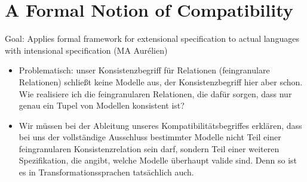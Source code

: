 
\section{A Formal Notion of Compatibility}
Goal: Applies formal framework for extensional specification to actual languages with intensional specification (MA Aurélien)


\begin{itemize}
    \item Problematisch: unser Konsistenzbegriff für Relationen (feingranulare Relationen) schließt keine Modelle aus, der Konsistenzbegriff hier aber schon. Wie realisiere ich die feingranularen Relationen, die dafür sorgen, dass nur genau ein Tupel von Modellen konsistent ist?
    \item Wir müssen bei der Ableitung unseres Kompatibilitätsbegriffes erklären, dass bei uns der vollständige Ausschluss bestimmter Modelle nicht Teil einer feingranularen Konsistenzrelation sein darf, sondern Teil einer weiteren Spezifikation, die angibt, welche Modelle überhaupt valide sind. Denn so ist es in Transformationssprachen tatsächlich auch.
\end{itemize}



